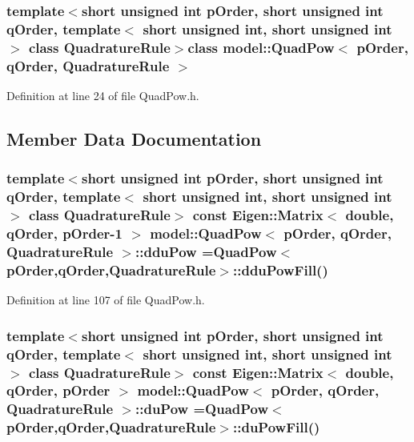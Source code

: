\subsubsection*{template$<$short unsigned int p\+Order, short unsigned int q\+Order, template$<$ short unsigned int, short unsigned int $>$ class Quadrature\+Rule$>$class model\+::\+Quad\+Pow$<$ p\+Order, q\+Order, Quadrature\+Rule $>$}



Definition at line 24 of file Quad\+Pow.\+h.



\subsection{Member Data Documentation}
\hypertarget{classmodel_1_1_quad_pow_af1b239374b835bda2a643f97f03fab38}{}
\subsubsection[{ddu\+Pow}]{\setlength{\rightskip}{0pt plus 5cm}template$<$short unsigned int p\+Order, short unsigned int q\+Order, template$<$ short unsigned int, short unsigned int $>$ class Quadrature\+Rule$>$ const Eigen\+::\+Matrix$<$ double, q\+Order, {\bf p\+Order}-\/1 $>$ {\bf model\+::\+Quad\+Pow}$<$ {\bf p\+Order}, q\+Order, Quadrature\+Rule $>$\+::ddu\+Pow ={\bf Quad\+Pow}$<${\bf p\+Order},q\+Order,Quadrature\+Rule$>$\+::ddu\+Pow\+Fill()\hspace{0.3cm}{\ttfamily [static]}}\label{classmodel_1_1_quad_pow_af1b239374b835bda2a643f97f03fab38}


Definition at line 107 of file Quad\+Pow.\+h.

\hypertarget{classmodel_1_1_quad_pow_abfee4edf14f4a62a1755222983506d70}{}
\subsubsection[{du\+Pow}]{\setlength{\rightskip}{0pt plus 5cm}template$<$short unsigned int p\+Order, short unsigned int q\+Order, template$<$ short unsigned int, short unsigned int $>$ class Quadrature\+Rule$>$ const Eigen\+::\+Matrix$<$ double, q\+Order, {\bf p\+Order} $>$ {\bf model\+::\+Quad\+Pow}$<$ {\bf p\+Order}, q\+Order, Quadrature\+Rule $>$\+::du\+Pow ={\bf Quad\+Pow}$<${\bf p\+Order},q\+Order,Quadrature\+Rule$>$\+::du\+Pow\+Fill()\hspace{0.3cm}{\ttfamily [static]}}\label{classmodel_1_1_quad_pow_abfee4edf14f4a62a1755222983506d70}


